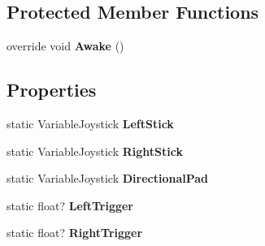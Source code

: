 \subsection*{Protected Member Functions}
\begin{DoxyCompactItemize}
\item 
\mbox{\label{class_game_pad_1_1_joystick_input_ad5938bcdf5127f2fa90af5420a11a2a8}} 
override void {\bfseries Awake} ()
\end{DoxyCompactItemize}
\subsection*{Properties}
\begin{DoxyCompactItemize}
\item 
\mbox{\label{class_game_pad_1_1_joystick_input_a107da0943c95338129f695ab73a10b5b}} 
static Variable\+Joystick {\bfseries Left\+Stick}
\item 
\mbox{\label{class_game_pad_1_1_joystick_input_a521d3915aacdaab571e28c4d2e55683e}} 
static Variable\+Joystick {\bfseries Right\+Stick}
\item 
\mbox{\label{class_game_pad_1_1_joystick_input_ae521a1a36036e6a0cedd689c0f51575e}} 
static Variable\+Joystick {\bfseries Directional\+Pad}
\item 
\mbox{\label{class_game_pad_1_1_joystick_input_a64f9fe3439637dfad7743b0326fd27ad}} 
static float? {\bfseries Left\+Trigger}
\item 
\mbox{\label{class_game_pad_1_1_joystick_input_a27758969e82afbb31e4d2b457c24a9b2}} 
static float? {\bfseries Right\+Trigger}
\end{DoxyCompactItemize}


